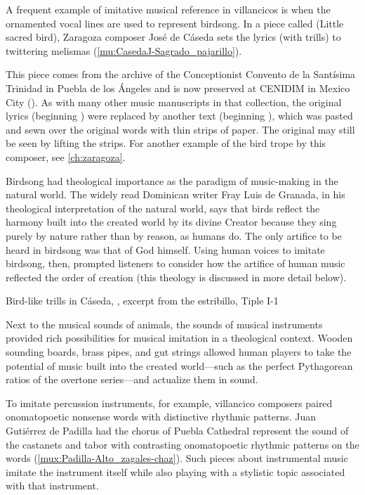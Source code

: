 A frequent example of imitative musical reference in villancicos is when the
ornamented vocal lines are used to represent birdsong.
In a piece called  (Little sacred bird), Zaragoza
composer José de Cáseda sets the lyrics  (with trills) to
twittering melismas (\cref{mu:CasedaJ-Sagrado_pajarillo}).%
\begin{Footnote} 
    This piece comes from the archive of the Conceptionist Convento de la
    Santísima Trinidad in Puebla de los Ángeles and is now preserved at CENIDIM
    in Mexico City ().
    As with many other music manuscripts in that collection, the original
    lyrics (beginning ) were replaced by another
    text (beginning ), which was pasted and sewn
    over the original words with thin strips of paper.  
    The original may still be seen by lifting the strips.
    For another example of the bird trope by this composer, see
    \cref{ch:zaragoza}.
\end{Footnote}
Birdsong had theological importance as the paradigm of music-making in the
natural world.
The widely read Dominican writer Fray Luis de Granada, in his theological
interpretation of the natural world, says that birds reflect the harmony built
into the created world by its divine Creator because they sing purely by nature
rather than by reason, as humans do.%
    \citXXX[luis]
The only artifice to be heard in birdsong was that of God himself.
Using human voices to imitate birdsong, then, prompted listeners to consider
how the artifice of human music reflected the order of creation (this theology
is discussed in more detail below). 

{Bird-like trills in Cáseda, , excerpt from the
estribillo, Tiple I-1}

Next to the musical sounds of animals, the sounds of musical instruments
provided rich possibilities for musical imitation in a theological context.
Wooden sounding boards, brass pipes, and gut strings allowed human players to
take the potential of music built into the created world---such as the perfect
Pythagorean ratios of the overtone series---and actualize them in sound.

To imitate percussion instruments, for example, villancico composers paired
onomatopoetic nonsense words with distinctive rhythmic patterns.
Juan Gutiérrez de Padilla had the chorus of Puebla Cathedral represent the
sound of the castanets and tabor with contrasting onomatopoetic rhythmic
patterns on the words  (\cref{mux:Padilla-Alto_zagales-chaz}).
Such pieces about instrumental music imitate the instrument itself while also
playing with a stylistic topic associated with that instrument.

